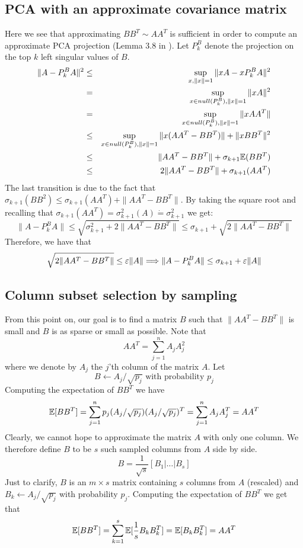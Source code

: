 \subsection*{PCA with an approximate covariance matrix}
Here we see that approximating $BB^T \sim AA^T$ is sufficient in order to compute an approximate PCA projection (Lemma 3.8 in \cite{rvSamplingFromLargeMatrices2007}).
Let $P_k^B$ denote the projection on the top $k$ left singular values of $B$.  
\begin{eqnarray}
\|A - P_k^B A\|^2 &\le& \sup_{x, \|x\|=1} \|xA - xP_k^B A\|^2 \\
&=& \sup_{x \in null(P_k^B), \|x\|=1} \|xA\|^2 \\
&=& \sup_{x \in null(P_k^B), \|x\|=1} \|xAA^T\| \\
&\le& \sup_{x \in null(P_k^B), \|x\|=1} \|x(AA^T-BB^T)\|  + \|xBB^T\|^2\\
&\le& \|AA^T - BB^T\| + \sigma_{k+1}{\mathbb E}(BB^T)\\
&\le& 2\|AA^T - BB^T\| + \sigma_{k+1}(AA^T)
\end{eqnarray}
The last transition is due to the fact that $ \sigma_{k+1}(BB^2) \le  \sigma_{k+1}(AA^T) + \|AA^T - BB^T\|$.
By taking the square root and recalling that $\sigma_{k+1}(AA^T) = \sigma_{k+1}^2(A)  \dot{=}  \sigma_{k+1}^2$ we get:
\[
\|A - P_k^B A\| \le \sqrt{\sigma_{k+1}^2 + 2\|AA^T - BB^T\|} \le \sigma_{k+1} +\sqrt{2\|AA^T - BB^T\|}
\]
Therefore, we have that 
\[
\sqrt{2\|AA^T - BB^T\|} \le \varepsilon\|A\| \Longrightarrow \|A - P_k^BA\| \le \sigma_{k+1}+\varepsilon\|A\|
\]

\subsection*{Column subset selection by sampling}
From this point on, our goal is to find a matrix $B$ such that $\|AA^T - BB^T\|$ is small and $B$ is as sparse or small as possible.
Note that 
\[
AA^T = \sum_{j=1}^{n}A_jA_j^2
\]
where we denote by $A_j$ the $j$'th column of the matrix $A$.
Let 
\[
B \leftarrow A_j/\sqrt{p_j} \mbox{ with probability } p_j
\]
Computing the expectation of $BB^T$ we have 
\[
{\mathbb E}[BB^T] = \sum_{j=1}^{n} p_j (A_j/\sqrt{p_j})(A_j/\sqrt{p_j})^T = \sum_{j=1}^{n} A_jA_j^T = AA^T
\]
Clearly, we cannot hope to approximate the matrix $A$ with only one column. 
We therefore define $B$ to be $s$ such sampled columns from $A$ side by side.
\[
B = \frac{1}{\sqrt{s}}[B_1 | \ldots | B_s]
\]
Just to clarify, $B$ is an $m \times s$ matrix containing $s$ columns from $A$ (rescaled) and $B_k \leftarrow A_j/\sqrt{p_j}$ with probability $p_j$.
Computing the expectation of $BB^T$ we get that 
\[
{\mathbb E}[BB^T] = \sum_{k=1}^{s} {\mathbb E}[\frac{1}{s}B_kB_k^T] = {\mathbb E}[B_kB_k^T] = AA^T
\] 

